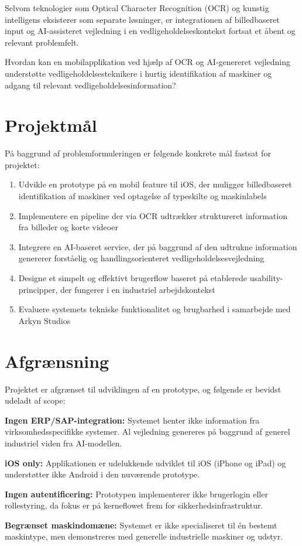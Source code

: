 Selvom teknologier som Optical Character Recognition (OCR) og kunstig intelligens eksisterer som separate løsninger, er integrationen af billedbaseret input og AI-assisteret vejledning i en vedligeholdelseskontekst fortsat et åbent og relevant problemfelt.

\begin{infobox}[Problemformulering]
Hvordan kan en mobilapplikation ved hjælp af OCR og AI-genereret vejledning understøtte vedligeholdelsesteknikere i hurtig identifikation af maskiner og adgang til relevant vedligeholdelsesinformation?
\end{infobox}

\section{Projektmål}
\label{sec:projektmaal}

På baggrund af problemformuleringen er følgende konkrete mål fastsat for projektet:

\begin{enumerate}
  \item Udvikle en prototype på en mobil feature til iOS, der muliggør billedbaseret identifikation af maskiner ved optagelse af typeskilte og maskinlabels
  \item Implementere en pipeline der via OCR udtrækker struktureret information fra billeder og korte videoer
  \item Integrere en AI-baseret service, der på baggrund af den udtrukne information genererer forståelig og handlingsorienteret vedligeholdelsesvejledning
  \item Designe et simpelt og effektivt brugerflow baseret på etablerede usability-principper, der fungerer i en industriel arbejdskontekst
  \item Evaluere systemets tekniske funktionalitet og brugbarhed i samarbejde med Arkyn Studios
\end{enumerate}

\section{Afgrænsning}
\label{sec:afgrænsning}

Projektet er afgrænset til udviklingen af en prototype, og følgende er bevidst udeladt af scope:

\textbf{Ingen ERP/SAP-integration:} Systemet henter ikke information fra virksomhedsspecifikke systemer. Al vejledning genereres på baggrund af generel industriel viden fra AI-modellen.

\textbf{iOS only:} Applikationen er udelukkende udviklet til iOS (iPhone og iPad) og understøtter ikke Android i den nuværende prototype.

\textbf{Ingen autentificering:} Prototypen implementerer ikke brugerlogin eller rollestyring, da fokus er på kerneflowet frem for sikkerhedsinfrastruktur.

\textbf{Begrænset maskindomæne:} Systemet er ikke specialiseret til én bestemt maskintype, men demonstreres med generelle industrielle maskiner og udstyr.

